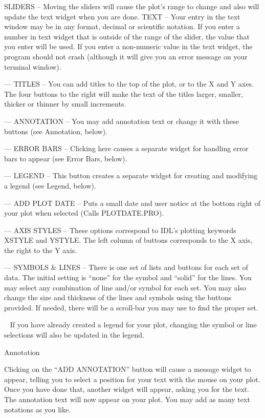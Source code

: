 \itemitem{$\triangleright $} SLIDERS -- Moving the sliders will cause the plot's
	range to change and also will update the text widget when you are done.
\itemitem{$\triangleright $} TEXT -- Your entry in the text window may be in
	any format, decimal or scientific notation.  If you enter a number in
	text widget that is outside of the range of the slider, the value that
	you enter will be used.  If you enter
	a non-numeric value in the text widget, the program should not crash 
	(although it will give you an error message on your terminal window).
\item{---} TITLES -- You can add titles to the top of the plot, or to the X and
	Y axes.  The four buttons to the right will make the text of the
	titles larger, smaller, thicker or thinner by small increments.
\item{---} ANNOTATION -- You may add annotation text or change it with these
	buttons (see Annotation, below).  
\item{---} ERROR BARS -- Clicking here causes a separate widget for handling 
	error bars to
	appear (see Error Bars, below).
\item{---} LEGEND -- This button creates a separate widget for creating and
	modifying a legend (see Legend, below).
\item{---} ADD PLOT DATE -- Puts a small date and user notice at the bottom
	right of your plot when selected (Calls PLOTDATE.PRO).
\item{---} AXIS STYLES -- These options correspond to IDL's plotting keywords
	XSTYLE and YSTYLE.  The left column of buttons corresponds to the X 
	axis, the
	right to the Y axis.  
\item{---} SYMBOLS \& LINES -- There is one set of lists and buttons for each
	set of data.  The initial setting is ``none'' for the symbol and 
	``solid'' for the lines.  You may select any combination of line 
	and/or symbol for
	each set.  You may also change the size and thickness of the lines and
	symbols using the buttons provided.  If needed, there will be a 
	scroll-bar you 
	may use to find the proper set.
 
\item{\ } If you have already created a legend for your plot, changing the 
	symbol or line selections will also be updated in the legend.

\vskip 3mm \centerline{\rmtwelve Annotation}

Clicking on the ``ADD ANNOTATION'' button will cause a message widget to 
appear,
telling you to select a position for your text with the mouse on your plot.
Once you have done that, another widget will appear, asking you for the text.
The annotation text will now appear on your plot.  You may add as many
text notations as you like.


